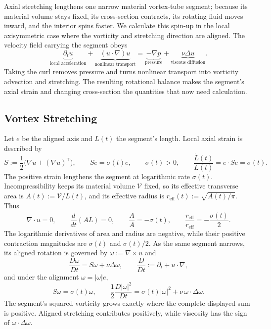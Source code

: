 
Axial stretching lengthens one narrow material vortex-tube segment; because its material volume stays fixed, its cross-section contracts, its rotating fluid moves inward, and the interior spins faster. We calculate this spin-up in the local axisymmetric case where the vorticity and stretching direction are aligned. The velocity field carrying the segment obeys
\[
  \underbrace{\partial_t u}_{\text{local acceleration}}
  +
  \underbrace{(u\cdot\nabla)u}_{\text{nonlinear transport}}
  =
  \underbrace{-\nabla p}_{\text{pressure}}
  +
  \underbrace{\nu\Delta u}_{\text{viscous diffusion}}.
\]
Taking the curl removes pressure and turns nonlinear transport into vorticity advection and stretching. The resulting rotational balance makes the segment's axial strain and changing cross-section the quantities that now need calculation.

\subsection{Vortex Stretching}\label{sub:ThePerfectlyStretchingVortex}

Let \(e\) be the aligned axis and \(L(t)\) the segment's length. Local axial strain is described by
\[
  S:=\frac12\bigl(\nabla u+(\nabla u)^{\mathsf T}\bigr),
  \qquad
  Se=\sigma(t)e,
  \qquad
  \sigma(t)>0,
  \qquad
  \frac{\dot L(t)}{L(t)}
  =
  e\cdot Se
  =
  \sigma(t).
\]
The positive strain lengthens the segment at logarithmic rate \(\sigma(t)\). Incompressibility keeps its material volume \(\mathcal V\) fixed, so its effective transverse area is \(A(t):=\mathcal V/L(t)\), and its effective radius is \(r_{\mathrm{eff}}(t):=\sqrt{A(t)/\pi}\). Thus
\[
  \nabla\cdot u=0,
  \qquad
  \frac{d}{dt}(A L)=0,
  \qquad
  \frac{\dot A}{A}=-\sigma(t),
  \qquad
  \frac{\dot r_{\mathrm{eff}}}{r_{\mathrm{eff}}}
  =
  -\frac{\sigma(t)}{2}.
\]
The logarithmic derivatives of area and radius are negative, while their positive contraction magnitudes are \(\sigma(t)\) and \(\sigma(t)/2\). As the same segment narrows, its aligned rotation is governed by \(\omega:=\nabla\times u\) and
\[
  \frac{D\omega}{Dt}
  =
  S\omega+\nu\Delta\omega,
  \qquad
  \frac{D}{Dt}
  :=
  \partial_t+u\cdot\nabla,
\]
and under the alignment \(\omega=|\omega|e\),
\[
  S\omega
  =
  \sigma(t)\omega,
  \qquad
  \frac12\frac{D|\omega|^2}{Dt}
  =
  \sigma(t)|\omega|^2
  +
  \nu\,\omega\cdot\Delta\omega.
\]
The segment's squared vorticity grows exactly where the complete displayed sum is positive. Aligned stretching contributes positively, while viscosity has the sign of \(\omega\cdot\Delta\omega\).

